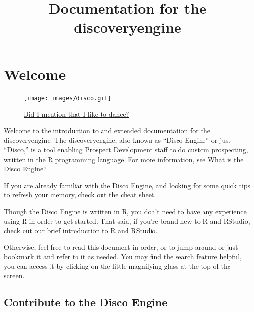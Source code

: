 \documentclass[]{book}
\title{Documentation for the discoveryengine}
\author{}
\date{}
\newenvironment{Shaded}{\begin{snugshade}}{\end{snugshade}}
\newcommand{\DataTypeTok}[1]{\textcolor[rgb]{0.13,0.29,0.53}{#1}}
\newcommand{\KeywordTok}[1]{\textcolor[rgb]{0.13,0.29,0.53}{\textbf{#1}}}
\newcommand{\NormalTok}[1]{#1}
\newcommand{\OperatorTok}[1]{\textcolor[rgb]{0.81,0.36,0.00}{\textbf{#1}}}
\newcommand{\OtherTok}[1]{\textcolor[rgb]{0.56,0.35,0.01}{#1}}
\newcommand{\StringTok}[1]{\textcolor[rgb]{0.31,0.60,0.02}{#1}}
\begin{document}
\maketitle

{
\setcounter{tocdepth}{1}
\tableofcontents
}
\begin{Shaded}
\end{Shaded}

\hypertarget{welcome}{%
\chapter{Welcome}\label{welcome}}

\begin{figure}
\centering
\texttt{[image: images/disco.gif]}
\caption{\href{https://www.youtube.com/watch?v=uxi73RQlLB8}{Did I mention that I like to dance?}}
\end{figure}

Welcome to the introduction to and extended documentation for the discoveryengine! The discoveryengine, also known as ``Disco Engine'' or just ``Disco,'' is a tool enabling Prospect Development staff to do custom prospecting, written in the R programming language. For more information, see \protect\hyperlink{what-is-disco}{What is the Disco Engine?}

If you are already familiar with the Disco Engine, and looking for some quick tips to refresh your memory, check out the \protect\hyperlink{cheat-sheet}{cheat sheet}.

Though the Disco Engine is written in R, you don't need to have any experience using R in order to get started. That said, if you're brand new to R and RStudio, check out our brief \protect\hyperlink{r-intro}{introduction to R and RStudio}.

Otherwise, feel free to read this document in order, or to jump around or just bookmark it and refer to it as needed. You may find the search feature helpful, you can access it by clicking on the little magnifying glass at the top of the screen.

\hypertarget{contribute-to-the-disco-engine}{%
\section{Contribute to the Disco Engine}\label{contribute-to-the-disco-engine}}
\end{document}
